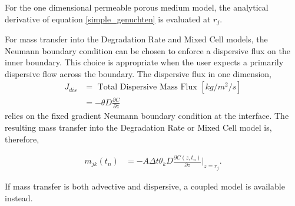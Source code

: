 For the one dimensional permeable porous medium model, the analytical 
derivative of equation \eqref{simple_genuchten} is evaluated at $r_j$.


For mass transfer into the Degradation Rate and Mixed Cell models, the Neumann 
boundary condition can be chosen to enforce a dispersive flux on the inner 
boundary. This choice is appropriate when the user expects a primarily 
dispersive flow across the boundary. The dispersive flux in one dimension, 
\begin{align}
      J_{dis} &= \mbox{ Total Dispersive Mass Flux }[kg/m^2/s]\nonumber\\
      &= -\theta D\frac{\partial C}{\partial z} \nonumber
\end{align}
relies on the fixed gradient Neumann boundary condition at the interface. 
The resulting mass transfer into the Degradation Rate or Mixed Cell model is, 
therefore, 

\begin{align}
m_{jk}(t_n) &= - A\Delta t \theta_k D \frac{\partial C(z,t_n)}{\partial z}|_{z=r_j}.
\end{align}

If mass transfer is both advective and dispersive, a coupled model is 
available instead.
